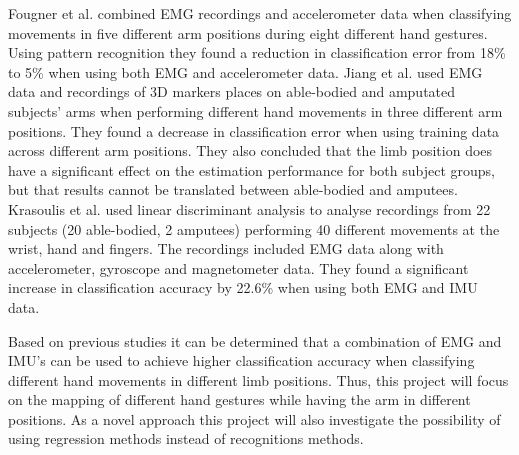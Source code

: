 Fougner et al. combined EMG recordings and accelerometer data when classifying movements in five different arm positions during eight different hand gestures. Using pattern recognition they found a reduction in classification error from 18\% to 5\% when using both EMG and accelerometer data. \cite{Fougner2011} Jiang et al. used EMG data and recordings of 3D markers places on able-bodied and amputated subjects' arms when performing different hand movements in three different arm positions. They found a decrease in classification error when using training data across different arm positions. They also concluded that the limb position does have a significant effect on the estimation performance for both subject groups, but that results cannot be translated between able-bodied and amputees. \cite{Jiang2013} Krasoulis et al. used linear discriminant analysis to analyse recordings from 22 subjects (20 able-bodied, 2 amputees) performing 40 different movements at the wrist, hand and fingers. The recordings included EMG data along with accelerometer, gyroscope and magnetometer data. They found a significant increase in classification accuracy by 22.6\% when using both EMG and IMU data. \cite{Krasoulis2017} 

Based on previous studies it can be determined that a combination of EMG and IMU's can be used to achieve higher classification accuracy when classifying different hand movements in different limb positions. Thus, this project will focus on the mapping of different hand gestures while having the arm in different positions. As a novel approach this project will also investigate the possibility of using regression methods instead of recognitions methods.  





  	
  	
  	
  	